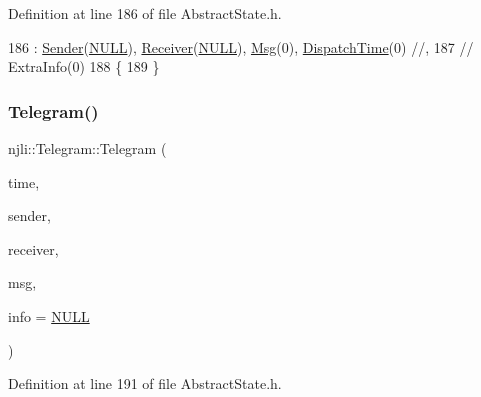 Definition at line 186 of file Abstract\+State.\+h.


\begin{DoxyCode}
186                : \mbox{\hyperlink{classnjli_1_1_telegram_ac8d9684f9beb98cdbfb912cefb18f036}{Sender}}(\mbox{\hyperlink{_abstract_state_8h_a070d2ce7b6bb7e5c05602aa8c308d0c4}{NULL}}), \mbox{\hyperlink{classnjli_1_1_telegram_aa2811ae30fb5bcbdb6dfd89bd1305b52}{Receiver}}(\mbox{\hyperlink{_abstract_state_8h_a070d2ce7b6bb7e5c05602aa8c308d0c4}{NULL}}), \mbox{\hyperlink{classnjli_1_1_telegram_a5b15d94b15ff8de3637c94f93744b26c}{Msg}}(0), 
      \mbox{\hyperlink{classnjli_1_1_telegram_ad3624ff53bc492416a0b19f39107bfeb}{DispatchTime}}(0) \textcolor{comment}{//,}
187     \textcolor{comment}{// ExtraInfo(0)}
188     \{
189     \}
\end{DoxyCode}
\mbox{\label{classnjli_1_1_telegram_ab4334c9796b4c8a8bbc3727061059c3d}} 
\subsubsection{\texorpdfstring{Telegram()}{Telegram()}\hspace{0.1cm}{\footnotesize\ttfamily [2/2]}}
{\footnotesize\ttfamily njli\+::\+Telegram\+::\+Telegram (\begin{DoxyParamCaption}\item[{\mbox{\hyperlink{_util_8h_a5f6906312a689f27d70e9d086649d3fd}{f32}}}]{time,  }\item[{\mbox{\hyperlink{classnjli_1_1_abstract_factory_object}{Abstract\+Factory\+Object}} $\ast$}]{sender,  }\item[{\mbox{\hyperlink{classnjli_1_1_abstract_factory_object}{Abstract\+Factory\+Object}} $\ast$}]{receiver,  }\item[{\mbox{\hyperlink{_util_8h_aa62c75d314a0d1f37f79c4b73b2292e2}{s32}}}]{msg,  }\item[{\mbox{\hyperlink{_thread_8h_af1e856da2e658414cb2456cb6f7ebc66}{void}} $\ast$}]{info = {\ttfamily \mbox{\hyperlink{_util_8h_a070d2ce7b6bb7e5c05602aa8c308d0c4}{N\+U\+LL}}} }\end{DoxyParamCaption})\hspace{0.3cm}{\ttfamily [inline]}}



Definition at line 191 of file Abstract\+State.\+h.



